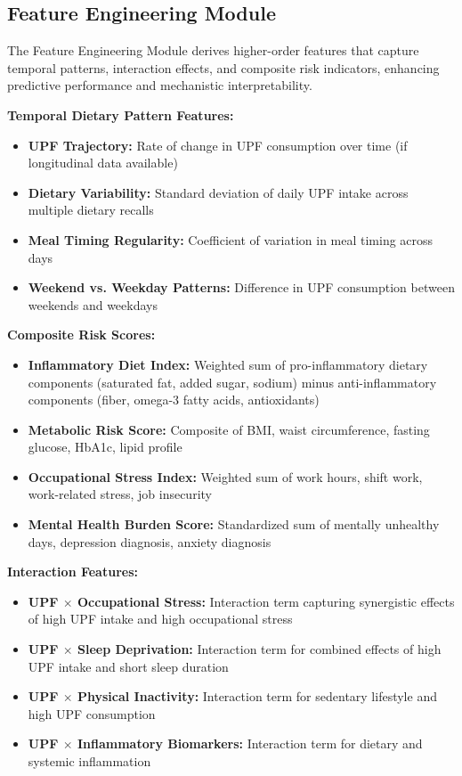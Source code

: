 \documentclass[journal,twoside,10pt]{IEEEtran}
\begin{document}
\subsection{Feature Engineering Module}

The Feature Engineering Module derives higher-order features that capture temporal patterns, interaction effects, and composite risk indicators, enhancing predictive performance and mechanistic interpretability.

\textbf{Temporal Dietary Pattern Features:}
\begin{itemize}
\item \textbf{UPF Trajectory:} Rate of change in UPF consumption over time (if longitudinal data available)
\item \textbf{Dietary Variability:} Standard deviation of daily UPF intake across multiple dietary recalls
\item \textbf{Meal Timing Regularity:} Coefficient of variation in meal timing across days
\item \textbf{Weekend vs. Weekday Patterns:} Difference in UPF consumption between weekends and weekdays
\end{itemize}

\textbf{Composite Risk Scores:}
\begin{itemize}
\item \textbf{Inflammatory Diet Index:} Weighted sum of pro-inflammatory dietary components (saturated fat, added sugar, sodium) minus anti-inflammatory components (fiber, omega-3 fatty acids, antioxidants)
\item \textbf{Metabolic Risk Score:} Composite of BMI, waist circumference, fasting glucose, HbA1c, lipid profile
\item \textbf{Occupational Stress Index:} Weighted sum of work hours, shift work, work-related stress, job insecurity
\item \textbf{Mental Health Burden Score:} Standardized sum of mentally unhealthy days, depression diagnosis, anxiety diagnosis
\end{itemize}

\textbf{Interaction Features:}
\begin{itemize}
\item \textbf{UPF $\times$ Occupational Stress:} Interaction term capturing synergistic effects of high UPF intake and high occupational stress
\item \textbf{UPF $\times$ Sleep Deprivation:} Interaction term for combined effects of high UPF intake and short sleep duration
\item \textbf{UPF $\times$ Physical Inactivity:} Interaction term for sedentary lifestyle and high UPF consumption
\item \textbf{UPF $\times$ Inflammatory Biomarkers:} Interaction term for dietary and systemic inflammation
\end{itemize}
\end{document}

